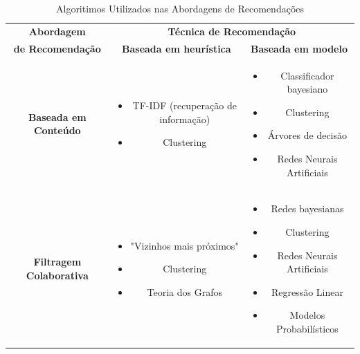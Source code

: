 \begin{table}[]
	\centering
	\caption{Algoritimos Utilizados nas Abordagens de Recomendações}
	\label{tab01}
	\begin{tabular}{|c|c|c|}
	\hline
	\rowcolor[HTML]{C0C0C0} 
	\cellcolor[HTML]{C0C0C0} \textbf{Abordagem} & \multicolumn{2}{c|}{\cellcolor[HTML]{C0C0C0} \textbf{Técnica de Recomendação}} \\ \cline{2-3} 
	\rowcolor[HTML]{C0C0C0} \textbf{de Recomendação}
	\multirow{-2}{*}{\cellcolor[HTML]{C0C0C0}} &  \textbf{Baseada em heurística} & \textbf{Baseada em modelo} \\ \hline
	\textbf{Baseada em Conteúdo	}   & \begin{minipage} [t] {0.3\textwidth} \begin{itemize} \item TF-IDF (recuperação de informação) \item Clustering \end{itemize} \end{minipage} & \begin{minipage} [t] {0.3\textwidth} \begin{itemize} \item Classificador bayesiano \item Clustering \item Árvores de decisão \item Redes Neurais Artificiais \end{itemize} \end{minipage} \\ \hline
	\rowcolor[HTML]{EFEFEF} 
	\textbf{Filtragem Colaborativa}	& \begin{minipage} [t] {0.3\textwidth} \begin{itemize} \item "Vizinhos mais próximos" \item Clustering \item Teoria dos Grafos \end{itemize} \end{minipage} & \begin{minipage} [t] {0.3\textwidth} \begin{itemize} \item  Redes bayesianas \item Clustering \item Redes Neurais Artificiais \item Regressão Linear \item Modelos Probabilísticos \end{itemize} \end{minipage} \\ \hline

\end{tabular}
\end{table}
